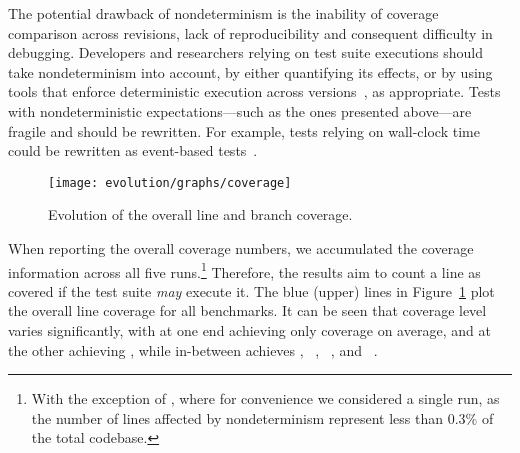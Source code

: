 The potential drawback of nondeterminism is the inability of coverage
comparison across revisions, lack of reproducibility and consequent
difficulty in debugging. Developers and researchers relying on test
suite executions should take nondeterminism into account, by either
quantifying its effects, or by using tools that enforce deterministic
execution across versions~\cite{mx}, as appropriate.
Tests with nondeterministic expectations---such as the
ones presented above---are fragile and should be rewritten. For
example, tests relying on wall-clock time could be rewritten as
event-based tests~\cite{imunit}.



\begin{figure}[t]
\centering
\texttt{[image: evolution/graphs/coverage]}
\caption{Evolution of the overall line and branch coverage.}
\label{fig:coverage}
\end{figure}

When reporting the overall coverage numbers, we accumulated the
coverage information across all five runs.\footnote{With the exception
of \git, where for convenience we considered a single run, as the
number of lines affected by nondeterminism represent less than
$0.3\%$ of the total codebase.} Therefore, the results aim to count a
line as covered if the test suite {\em may} execute it.  The blue
(upper) lines in Figure~\ref{fig:coverage} plot the overall line
coverage for all benchmarks.  It can be seen that coverage level
varies significantly, with \beanstalkd at one end achieving
only \beanstalkdCoverageAverage coverage on average, and \git at the
other achieving
\gitCoverageAverage, while in-between \lighttpdtwo achieves
\lighttpdtwoCoverageAverage, \redis~\redisCoverageAverage,
\zeromq~\zeromqCoverageAverage, and
\memcached~\memcachedCoverageAverage.

